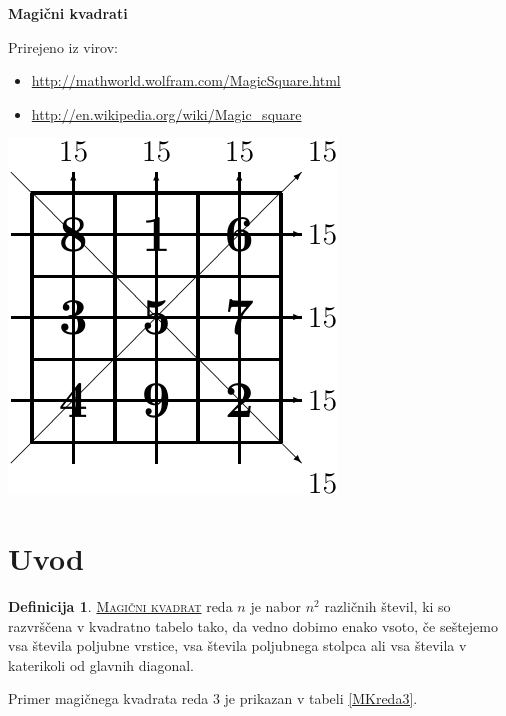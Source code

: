 \documentclass[a4paper,12pt]{article}
\newcommand{\pojem}[1]{\underline{\textsc{#1}}}
\theoremstyle{definition}
\newtheorem{definicija}{Definicija}
\theoremstyle{plain}
\theoremstyle{plain}
\begin{document}
\begin{center}
   \textbf{ \LARGE Magični kvadrati}
\end{center}


Prirejeno iz virov:
\begin{itemize}
   \item \url{http://mathworld.wolfram.com/MagicSquare.html}
   \item \url{http://en.wikipedia.org/wiki/Magic_square}
\end{itemize}

\begin{center}
   \includegraphics{slika.pdf}
\end{center}

\tableofcontents

\newpage


\section{Uvod}

\begin{definicija}
   \pojem{Magični kvadrat} reda $ n $  je nabor $ n^2 $ različnih števil,
   ki so razvrščena v kvadratno tabelo tako, da vedno dobimo enako vsoto,
   če seštejemo vsa števila poljubne vrstice, vsa števila poljubnega
   stolpca ali vsa števila v katerikoli od glavnih diagonal.
\end{definicija}

Primer magičnega kvadrata reda 3 je prikazan v tabeli \ref{MKreda3}.
\end{document}
